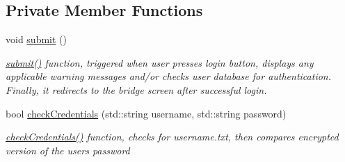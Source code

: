 \subsection*{Private Member Functions}
\begin{DoxyCompactItemize}
\item 
void \hyperlink{classLoginWidget_af42b318f75370fd66e74c400bae44a4d}{submit} ()\hypertarget{classLoginWidget_af42b318f75370fd66e74c400bae44a4d}{}\label{classLoginWidget_af42b318f75370fd66e74c400bae44a4d}

\begin{DoxyCompactList}\small\item\em \hyperlink{classLoginWidget_af42b318f75370fd66e74c400bae44a4d}{submit()} function, triggered when user presses login button, displays any applicable warning messages and/or checks user database for authentication. Finally, it redirects to the bridge screen after successful login. \end{DoxyCompactList}\item 
bool \hyperlink{classLoginWidget_aa33a1ece55b698e9d5b8c91413715b36}{check\+Credentials} (std\+::string username, std\+::string password)
\begin{DoxyCompactList}\small\item\em \hyperlink{classLoginWidget_aa33a1ece55b698e9d5b8c91413715b36}{check\+Credentials()} function, checks for username.\+txt, then compares encrypted version of the user\textquotesingle{}s password \end{DoxyCompactList}\end{DoxyCompactItemize}
